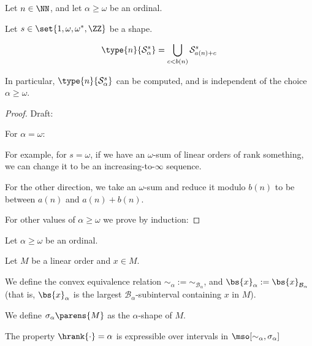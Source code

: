 \begin{lemma}
  Let $n \in \NN$, and let $\alpha \ge \omega$ be an ordinal.

  Let $s \in \set{1, \omega, \omega^\ast, \ZZ}$ be a shape.

  \[\type{n}{\mathcal{S}^{s}_{\alpha}} = \bigcup_{c < b(n)}{\mathcal{S}^{s}_{a(n) + c}                                                                                                                                                                                                                                                                                                                                                                                                                                       }\]

  In particular, $\type{n}{\mathcal{S}^{s}_{\alpha}}$ can be
  computed, and is independent of the choice $\alpha \ge \omega$.
\end{lemma}

\begin{proof}
  Draft:

  For $\alpha = \omega$:

  For example, for $s = \omega$, if we have an $\omega$-sum
  of linear orders of rank something, we can change it
  to be an increasing-to-$\infty$ sequence.

  For the other direction, we take an $\omega$-sum and reduce it modulo
  $b(n)$ to be between $a(n)$ and $a(n) + b(n)$.

  For other values of $\alpha \ge \omega$ we prove by induction:
\end{proof}

\begin{definition}
  Let $\alpha \ge \omega$ be an ordinal.

  Let $M$ be a linear order and $x \in M$.

  We define the convex equivalence relation $\sim_\alpha := \sim_{\mathcal{B}_{\alpha}}$,
  and $\bs{x}_{\alpha} := \bs{x}_{\mathcal{B}_{\alpha}}$ (that is,
  $\bs{x}_{\alpha}$ is the largest $\mathcal{B}_{\alpha}$-subinterval
  containing $x$ in $M$).

  We define $\sigma_{\alpha} \parens{M}$ as
  the $\alpha$-shape of $M$.
\end{definition}


\begin{lemma}
  The property
  $\hrank{\cdot} = \alpha$ is expressible over intervals
  in $\mso[\sim_{\alpha}, \sigma_{\alpha}]$
\end{lemma}


